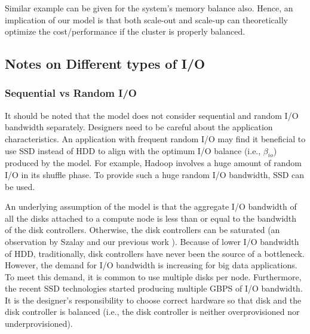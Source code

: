 \documentclass[journal]{IEEEtran}
\begin{document}
Similar example can be given for the system's memory balance also. Hence, an implication of our model is that both scale-out and scale-up can theoretically optimize the cost/performance if the cluster is properly balanced.
 

\subsection{Notes on Different types of I/O}
\subsubsection{Sequential vs Random I/O}
It should be noted that the model does not consider sequential and random I/O bandwidth separately. Designers need to be careful about the application characteristics. An application with frequent random I/O may find it beneficial to use SSD instead of HDD to align with the optimum I/O balance (i.e., $\beta_{io}$) produced by the model. For example, Hadoop involves a huge amount of random I/O  in its shuffle phase. To provide such a huge random I/O bandwidth, SSD can be used. 

An underlying assumption of the model is that the aggregate I/O bandwidth of all the disks attached to a compute node is less than or equal to the bandwidth of the disk controllers. Otherwise, the disk controllers can be saturated (an observation by Szalay \cite{cluster:AmdahlBalancedBlade} and our previous work \cite{scaleupscaleout:das2015evaluating}). Because of lower I/O bandwidth of HDD, traditionally, disk controllers have never been the source of a bottleneck. However, the demand for I/O bandwidth is increasing for big data applications. To meet this demand, it is common to  use multiple disks per node. Furthermore, the recent SSD technologies started producing multiple GBPS of I/O bandwidth. It is the designer's responsibility to choose correct hardware so that disk and the disk controller is balanced (i.e., the disk controller is neither overprovisioned nor underprovisioned). 
\end{document}
